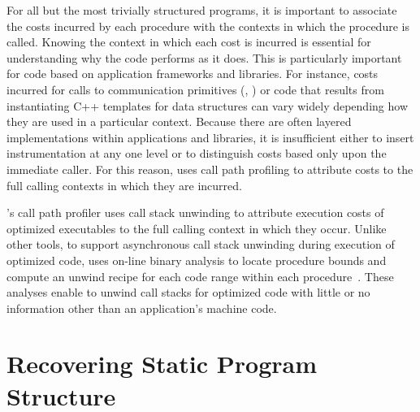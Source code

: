 \documentclass[11pt,letterpaper]{report}
\begin{document}
For all but the most trivially structured programs, it is important to associate the costs incurred by each procedure with the contexts in which the procedure is called.
Knowing the context in which each cost is incurred is essential for understanding why the code performs as it does.
This is particularly important for code based on application frameworks and libraries.
For instance, costs incurred for calls to communication primitives (\eg{}, ) or code that results from instantiating C++ templates for data structures can vary widely depending how they are used in a particular context.
Because there are often layered implementations within applications and libraries, it is insufficient either to insert instrumentation at any one level or to distinguish costs based only upon the immediate caller.
For this reason, \HPCToolkit{} uses call path profiling to attribute costs to the full calling contexts in which they are incurred.

\HPCToolkit{}'s \hpcrun{} call path profiler uses call stack unwinding to attribute execution costs of optimized executables to the full calling context in which they occur.
Unlike other tools, to support asynchronous call stack unwinding during execution of optimized code, \hpcrun{} uses on-line binary analysis to locate procedure bounds and compute an unwind recipe for each code range within each procedure~\cite{Tallent-MC-Fagan:2009:PLDI-hpctoolkit-binary-analysis}.
These analyses enable \hpcrun{} to unwind call stacks for optimized code with little or no information other than an application's machine code. 

\section{Recovering Static Program Structure}
\end{document}
